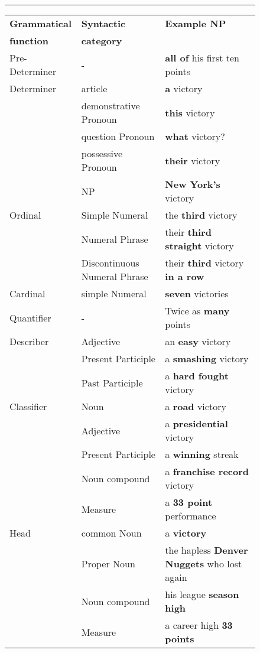 \begin{figure*} [t]
\rule[.3cm]{\textwidth}{.01in}
\begin{tabular}{|l|l|l|}\hline
{\bf Grammatical} & {\bf Syntactic} & {\bf Example NP}\\
{\bf function}    & {\bf category}  &\\\hline
Pre-Determiner & - & {\bf all of} his first ten points\\\hline
Determiner & article & {\bf a} victory\\\cline{2-3}
& demonstrative Pronoun & {\bf this} victory\\\cline{2-3}
& question Pronoun & {\bf what} victory?\\\cline{2-3}
& possessive Pronoun & {\bf their} victory\\\cline{2-3}
& NP & {\bf New York's} victory\\\hline
Ordinal & Simple Numeral & the {\bf third} victory\\\cline{2-3}
& Numeral Phrase & their {\bf third straight} victory\\\cline{2-3}
& Discontinuous Numeral Phrase & their {\bf third} victory {\bf in a row}\\\hline
Cardinal & simple Numeral & {\bf seven} victories\\\hline
Quantifier & - & Twice as {\bf many} points\\\hline
Describer & Adjective & an {\bf easy} victory\\\cline{2-3}
& Present Participle & a {\bf smashing} victory\\\cline{2-3}
& Past Participle & a {\bf hard fought} victory\\\hline
Classifier & Noun & a {\bf road} victory\\\cline{2-3}
& Adjective & a {\bf presidential} victory\\\cline{2-3}
& Present Participle & a {\bf winning} streak\\\cline{2-3}
& Noun compound & a {\bf franchise record} victory\\\cline{2-3}
& Measure & a {\bf 33 point} performance\\\hline
Head & common Noun & a {\bf victory}\\\cline{2-3}
& Proper Noun & the hapless {\bf Denver Nuggets} who lost again\\\cline{2-3}
& Noun compound & his league {\bf season high}\\\cline{2-3}
& Measure & a career high {\bf 33 points}\\\cline{2-3}

\end{tabular}
\end{figure*}
